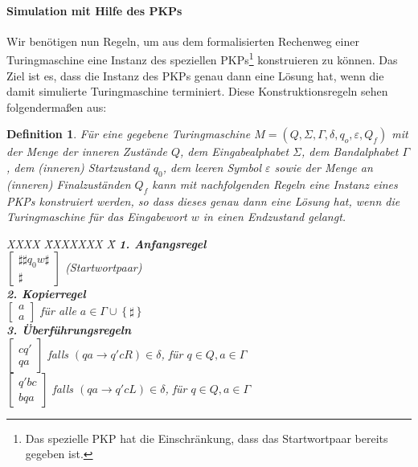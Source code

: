 \documentclass[]{scrartcl}
\newtheorem{definition}{Definition}[section]
\begin{document}
		\paragraph{Simulation mit Hilfe des PKPs}
			Wir benötigen nun Regeln, um aus dem formalisierten Rechenweg einer Turingmaschine eine Instanz des speziellen PKPs\footnote{Das spezielle PKP hat die Einschränkung, dass das Startwortpaar bereits gegeben ist.} konstruieren zu können. Das Ziel ist es, dass die Instanz des PKPs genau dann eine Lösung hat, wenn die damit simulierte Turingmaschine terminiert. Diese Konstruktionsregeln sehen folgendermaßen aus:
			\begin{definition}
				\label{def-simulation}
				Für eine gegebene Turingmaschine $M = (Q, \Sigma, \varGamma, \delta, q_o, \varepsilon ,Q_f)$ mit der Menge der inneren Zustände $Q$, dem Eingabealphabet $\Sigma$, dem Bandalphabet $\varGamma$, dem (inneren) Startzustand $q_0$, dem leeren Symbol $\varepsilon$ sowie der Menge an (inneren) Finalzuständen $Q_f$ kann mit nachfolgenden Regeln eine Instanz eines PKPs konstruiert werden, so dass dieses genau dann eine Lösung hat, wenn die Turingmaschine für das Eingabewort $w$ in einen Endzustand gelangt.
				\begin{tabbing}
					XXXX \= XXXXXXX \= X \kill
						\textbf{1. Anfangsregel}\\
							\> \textbullet $\begin{bmatrix}\sharp\sharp q_0w\sharp \\ \sharp\end{bmatrix}$ \> (Startwortpaar)\\
						\textbf{2. Kopierregel}\\
							\> \textbullet$\begin{bmatrix} a \\ a \end{bmatrix}$ \> für alle $a \in \varGamma \cup \left\lbrace \sharp \right\rbrace$\\
						\textbf{3. Überführungsregeln}\\
							\> \textbullet$\begin{bmatrix} cq' \\ qa \end{bmatrix}$ \> falls $(qa \rightarrow q'cR) \in \delta$, für $q \in Q, a \in \varGamma$ \\
							\> \textbullet$\begin{bmatrix} q'bc \\ bqa \end{bmatrix}$ \> falls $(qa \rightarrow q'cL) \in \delta$, für $q \in Q, a \in \varGamma$\\

\end{tabbing}
\end{definition}
\end{document}
